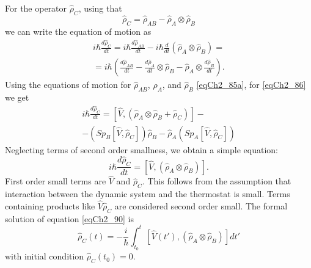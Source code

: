 For the operator $\hat{\rho}_C$, using that
\[
\hat{\rho}_C = \hat{\rho}_{AB} - \hat{\rho}_A \otimes \hat{\rho}_B
\]
we can write the equation of motion as
\begin{eqnarray}
i \hbar \frac{d \hat{\rho}_C}{d t} = i \hbar \frac{d
  \hat{\rho}_{AB}}{d t} - i \hbar 
\frac{d}{d t} \left(\hat{\rho}_A \otimes \hat{\rho}_B\right) = 
\nonumber \\
= i \hbar
\left(
\frac{d \hat{\rho}_{AB}}{d t} -
\frac{d \hat{\rho}_{A}}{d t} \otimes \hat{\rho}_{B} - 
\hat{\rho}_{A} \otimes \frac{d \hat{\rho}_{B}}{d t}
\right).
\label{eqCh2_86}
\end{eqnarray}
Using the equations of motion for $\hat{\rho}_{AB}$, $\hat{\rho}_{A}$,
and $\hat{\rho}_{B}$ \eqref{eqCh2_85a}, for \eqref{eqCh2_86} we get 
\begin{eqnarray}
i \hbar \frac{d \hat{\rho}_C}{d t} = 
\left[\hat{V}, \left(\hat{\rho}_A \otimes \hat{\rho}_B +
  \hat{\rho}_{C}\right)\right] - 
\nonumber \\
- 
\left(Sp_B\left[\hat{V}, \hat{\rho}_C\right]\right)\hat{\rho}_B -
\hat{\rho}_A \left(Sp_A\left[\hat{V}, \hat{\rho}_C\right]\right)
\label{eqCh2_89}
\end{eqnarray}
Neglecting terms of second order smallness, we obtain a simple equation:
\begin{equation}
i \hbar \frac{d \hat{\rho}_C}{d t} = 
\left[\hat{V}, \left(\hat{\rho}_A \otimes \hat{\rho}_B\right)\right]. 
\label{eqCh2_90}
\end{equation}
First order small terms are $\hat{V}$ and $\hat{\rho}_C$.
This follows from the assumption that interaction between the dynamic system and the thermostat is small. Terms containing products like $\hat{V}\hat{\rho}_C$ are considered second order small. The formal solution of equation \eqref{eqCh2_90} is  
\begin{equation}
\hat{\rho}_C\left(t\right) = - \frac{i}{\hbar}\int_{t_0}^t
\left[\hat{V}\left(t'\right), \left(\hat{\rho}_A \otimes
  \hat{\rho}_B\right)\right] dt' 
\label{eqCh2_91}
\end{equation}
with initial condition $\hat{\rho}_C\left(t_0\right) = 0$. 


